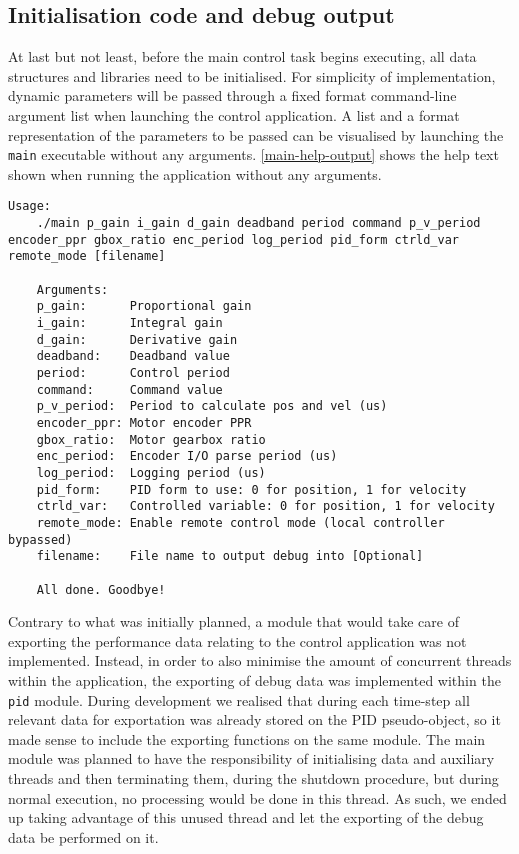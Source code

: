 \subsection{Initialisation code and debug output} \label{init-code}
At last but not least, before the main control task begins executing, all data structures and libraries need to be initialised.
For simplicity of implementation, dynamic parameters will be passed through a fixed format command-line argument list when launching the control application.
A list and a format representation of the parameters to be passed can be visualised by launching the \verb|main| executable without any arguments.
\autoref{main-help-output} shows the help text shown when running the application without any arguments.

\begin{lstlisting}[float=htp,breaklines=true,caption=Output showing the help information,label=main-help-output]
	Usage:
	./main p_gain i_gain d_gain deadband period command p_v_period encoder_ppr gbox_ratio enc_period log_period pid_form ctrld_var remote_mode [filename]
	
	Arguments:
	p_gain:      Proportional gain
	i_gain:      Integral gain
	d_gain:      Derivative gain
	deadband:    Deadband value
	period:      Control period
	command:     Command value
	p_v_period:  Period to calculate pos and vel (us)
	encoder_ppr: Motor encoder PPR
	gbox_ratio:  Motor gearbox ratio
	enc_period:  Encoder I/O parse period (us)
	log_period:  Logging period (us)
	pid_form:    PID form to use: 0 for position, 1 for velocity
	ctrld_var:   Controlled variable: 0 for position, 1 for velocity
	remote_mode: Enable remote control mode (local controller bypassed)
	filename:    File name to output debug into [Optional]
	
	All done. Goodbye!
\end{lstlisting}

Contrary to what was initially planned, a module that would take care of exporting the performance data relating to the control application was not implemented.
Instead, in order to also minimise the amount of concurrent threads within the application, the exporting of debug data was implemented within the \verb|pid| module.
During development we realised that during each time-step all relevant data for exportation was already stored on the PID pseudo-object, so it made sense to include the exporting functions on the same module.
The main module was planned to have the responsibility of initialising data and auxiliary threads and then terminating them, during the shutdown procedure, but during normal execution, no processing would be done in this thread.
As such, we ended up taking advantage of this unused thread and let the exporting of the debug data be performed on it.

